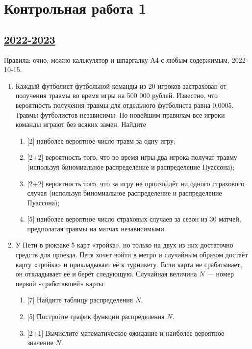 
\newpage
\thispagestyle{empty}
\section{Контрольная работа 1}


\subsection[2022-2023]{\hyperref[sec:sol_kr_01_2022_2023]{2022-2023}}
\label{sec:kr_01_2022_2023} %

Правила: очно, можно калькулятор и шпаргалку А4 с любым содержимым, 2022-10-15.


\begin{enumerate}
\item Каждый футболист футбольной команды из 20 игроков застрахован от получения травмы во время игры на 500 000 рублей. 
Известно, что вероятность получения травмы для отдельного футболиста равна 0.0005. 
Травмы футболистов независимы. По новейшим правилам все игроки команды играют без всяких замен. 
Найдите 
\begin{enumerate}
\item 	{[2]} наиболее вероятное число травм за одну игру;
\item 	{[2+2]} вероятность того, что во время игры два игрока получат травму (используя биномиальное распределение и распределение Пуассона);
\item 	{[2+2]} вероятность того, что за игру не произойдёт ни одного страхового случая (используя биномиальное распределение и распределение Пуассона);
\item 	{[5]} наиболее вероятное число страховых случаев за сезон из 30 матчей, предполагая травмы на матчах независимыми.
\end{enumerate}



\item У Пети в рюкзаке 5 карт «тройка», но только на двух из них достаточно средств для проезда. 
Петя хочет войти в метро и случайным образом достаёт карту «тройка» и прикладывает её к турникету. 
Если карта не срабатывает, он откладывает её и берёт следующую. 
Случайная величина $N$ — номер первой «сработавшей» карты.
\begin{enumerate}
\item {[7]} Найдите таблицу распределения $N$.
\item {[5]} Постройте график функции распределения $N$.
\item {[2+1]} Вычислите математическое ожидание и наиболее вероятное значение $N$.
\end{enumerate}



\end{enumerate}
